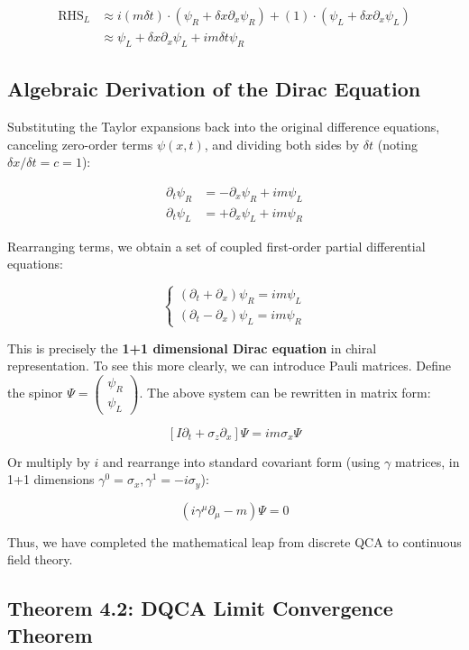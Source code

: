 \begin{align*}
\text{RHS}_L &\approx i (m \delta t) \cdot (\psi_R + \delta x \partial_x \psi_R) + (1) \cdot (\psi_L + \delta x \partial_x \psi_L) \\
&\approx \psi_L + \delta x \partial_x \psi_L + i m \delta t \psi_R
\end{align*}

\subsection{Algebraic Derivation of the Dirac Equation}

Substituting the Taylor expansions back into the original difference equations, canceling zero-order terms $\psi(x,t)$, and dividing both sides by $\delta t$ (noting $\delta x/\delta t = c = 1$):

\begin{align*}
\partial_t \psi_R &= -\partial_x \psi_R + i m \psi_L \\
\partial_t \psi_L &= +\partial_x \psi_L + i m \psi_R
\end{align*}

Rearranging terms, we obtain a set of coupled first-order partial differential equations:

\[\begin{cases}
(\partial_t + \partial_x) \psi_R = i m \psi_L \\
(\partial_t - \partial_x) \psi_L = i m \psi_R
\end{cases}\]

This is precisely the \textbf{1+1 dimensional Dirac equation} in chiral representation. To see this more clearly, we can introduce Pauli matrices. Define the spinor $\Psi = \begin{pmatrix} \psi_R \\ \psi_L \end{pmatrix}$. The above system can be rewritten in matrix form:

\[\left[ I \partial_t + \sigma_z \partial_x \right] \Psi = i m \sigma_x \Psi\]

Or multiply by $i$ and rearrange into standard covariant form (using $\gamma$ matrices, in 1+1 dimensions $\gamma^0 = \sigma_x, \gamma^1 = -i\sigma_y$):

\[(i \gamma^\mu \partial_\mu - m) \Psi = 0\]

Thus, we have completed the mathematical leap from discrete QCA to continuous field theory.

\subsection{Theorem 4.2: DQCA Limit Convergence Theorem}

